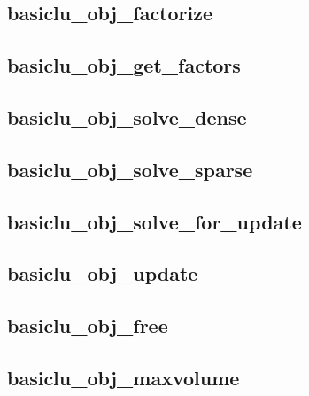 \documentclass{article}
\begin{document}
\newpage
\subsection{basiclu\_obj\_factorize}
{\footnotesize

}

\newpage
\subsection{basiclu\_obj\_get\_factors}
{\footnotesize

}

\newpage
\subsection{basiclu\_obj\_solve\_dense}
{\footnotesize

}

\newpage
\subsection{basiclu\_obj\_solve\_sparse}
{\footnotesize

}

\newpage
\subsection{basiclu\_obj\_solve\_for\_update}
{\footnotesize

}

\newpage
\subsection{basiclu\_obj\_update}
{\footnotesize

}

\newpage
\subsection{basiclu\_obj\_free}
{\footnotesize

}

\newpage
\subsection{basiclu\_obj\_maxvolume}
{\footnotesize

}
\newpage
 
\end{document}
